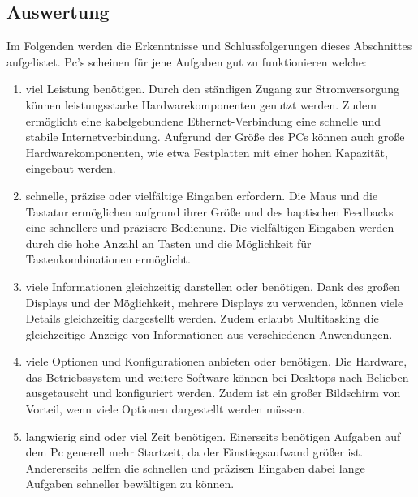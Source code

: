 \subsection{Auswertung}
Im Folgenden werden die Erkenntnisse und Schlussfolgerungen dieses Abschnittes aufgelistet. %
%
\newline%
\myNewSection%
Pc's scheinen für jene Aufgaben gut zu funktionieren welche: %
\begin{enumerate}%
	\item viel Leistung benötigen.\newline%
	Durch den ständigen Zugang zur Stromversorgung können leistungsstarke Hardwarekomponenten genutzt werden. Zudem ermöglicht eine kabelgebundene Ethernet-Verbindung eine schnelle und stabile Internetverbindung. Aufgrund der Größe des PCs können auch große Hardwarekomponenten, wie etwa Festplatten mit einer hohen Kapazität, eingebaut werden.%
	\item schnelle, präzise oder vielfältige Eingaben erfordern.\newline%
	Die Maus und die Tastatur ermöglichen aufgrund ihrer Größe und des haptischen Feedbacks eine schnellere und präzisere Bedienung. Die vielfältigen Eingaben werden durch die hohe Anzahl an Tasten und die Möglichkeit für Tastenkombinationen ermöglicht.%
	\item viele Informationen gleichzeitig darstellen oder benötigen.\newline%
	Dank des großen Displays und der Möglichkeit, mehrere Displays zu verwenden, können viele Details gleichzeitig dargestellt werden. Zudem erlaubt Multitasking die gleichzeitige Anzeige von Informationen aus verschiedenen Anwendungen.%
	\item viele Optionen und Konfigurationen anbieten oder benötigen.\newline%
	Die Hardware, das Betriebssystem und weitere Software können bei Desktops nach Belieben ausgetauscht und konfiguriert werden. Zudem ist ein großer Bildschirm von Vorteil, wenn viele Optionen dargestellt werden müssen.%
	\item langwierig sind oder viel Zeit benötigen.\newline%
	Einerseits benötigen Aufgaben auf dem Pc generell mehr Startzeit, da der Einstiegsaufwand größer ist. Andererseits helfen die schnellen und präzisen Eingaben dabei lange Aufgaben schneller bewältigen zu können.%
\end{enumerate}%

